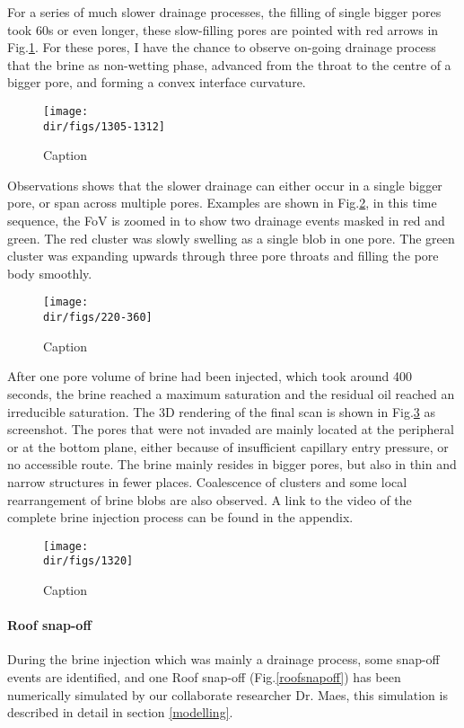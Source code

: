 For a series of much slower drainage processes, the filling of single bigger pores took 60s or even longer, these slow-filling pores are pointed with red arrows in Fig.\ref{1305-1312}. For these pores, I have the chance to observe on-going drainage process that the brine as non-wetting phase, advanced from the throat to the centre of a bigger pore, and forming a convex interface curvature. 

\begin{figure}
    \centering
    \texttt{[image: \\dir/figs/1305-1312]}
    \caption{Caption}
    \label{1305-1312}
\end{figure}

Observations shows that the slower drainage can either occur in a single bigger pore, or span across multiple pores. Examples are shown in Fig.\ref{220-360}, in this time sequence, the FoV is zoomed in to show two drainage events masked in red and green. The red cluster was slowly swelling as a single blob in one pore. The green cluster was expanding upwards through three pore throats and filling the pore body smoothly. 

\begin{figure}
    \centering
    \texttt{[image: \\dir/figs/220-360]}
    \caption{Caption}
    \label{220-360}
\end{figure}

After one pore volume of brine had been injected, which took around 400 seconds, the brine reached a maximum saturation and the residual oil reached an irreducible saturation. The 3D rendering of the final scan is shown in Fig.\ref{1320} as screenshot. The pores that were not invaded are mainly located at the peripheral or at the bottom plane, either because of insufficient capillary entry pressure, or no accessible route. The brine mainly resides in bigger pores, but also in thin and narrow structures in fewer places. Coalescence of clusters and some local rearrangement of brine blobs are also observed. A link to the video of the complete brine injection process can be found in the appendix.

\begin{figure}
    \centering
    \texttt{[image: \\dir/figs/1320]}
    \caption{Caption}
    \label{1320}
\end{figure}

\paragraph{Roof snap-off}
During the brine injection which was mainly a drainage process, some snap-off events are identified, and one Roof snap-off (Fig.\ref{roofsnapoff}) has been numerically simulated by our collaborate researcher Dr. Maes, this simulation is described in detail in section \ref{modelling}. 

